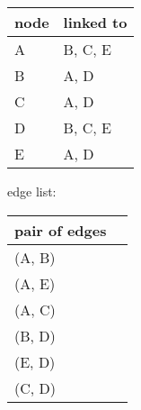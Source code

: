 \begin{enumerate}
	\begin{tabular}{ | m{3cm} | m{3cm} | } 
		\hline
		node & linked to \\ 
		\hline
		A & B, C, E \\ 
		\hline
		B & A, D \\ 
		\hline
		C & A, D \\ 
		\hline
		D & B, C, E \\ 
		\hline
		E & A, D \\ 
		\hline
	\end{tabular}

	edge list:

	\begin{tabular}{ | m{3cm} | m{3cm} | } 
		\hline
		pair of edges \\ 
		\hline
		(A, B) \\ 
		\hline
		(A, E) \\ 
		\hline
		(A, C) \\ 
		\hline
		(B, D) \\ 
		\hline
		(E, D) \\ 
		\hline
		(C, D) \\ 
		\hline
	\end{tabular}
	
\end{enumerate}